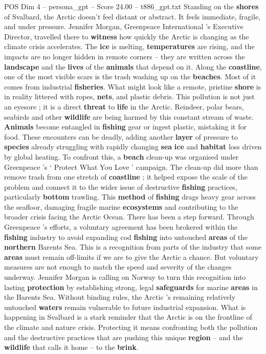 \begin{textsample}{POS Dim 4 – persona\_gpt – Score 24.00 – t886\_gpt.txt}  \label{ex:f4_pos_030}
Standing on the \textbf{shores} of Svalbard, the Arctic doesn't feel distant or abstract.
It feels immediate, fragile, and under pressure.
Jennifer Morgan, Greenpeace International ’s Executive Director, travelled there to \textbf{witness} how quickly the Arctic is changing as the climate crisis accelerates.
The \textbf{ice} is melting, \textbf{temperatures} are rising, and the impacts are no longer hidden in remote corners – they are written across the \textbf{landscape} and the \textbf{lives} of the \textbf{animals} that depend on it.
Along the \textbf{coastline}, one of the most visible scars is the trash washing up on the \textbf{beaches}.
Most of it comes from industrial \textbf{fisheries}.
What might look like a remote, pristine \textbf{shore} is in reality littered with ropes, \textbf{nets}, and plastic debris.
This pollution is not just an eyesore ; it is a direct \textbf{threat} to \textbf{life} in the Arctic.
Reindeer, polar bears, seabirds and other \textbf{wildlife} are being harmed by this constant stream of waste. \textbf{Animals} become entangled in \textbf{fishing} gear or ingest plastic, mistaking it for food.
These encounters can be deadly, adding another \textbf{layer} of pressure to \textbf{species} already struggling with rapidly changing \textbf{sea} \textbf{ice} and \textbf{habitat} loss driven by global heating.
To confront this, a \textbf{beach} clean-up was organised under Greenpeace ’s ‘ Protect What You Love ’ campaign.
The clean-up did more than remove trash from one stretch of \textbf{coastline} ; it helped expose the scale of the problem and connect it to the wider issue of destructive \textbf{fishing} practices, particularly \textbf{bottom} trawling.
This \textbf{method} of \textbf{fishing} drags heavy gear across the seafloor, damaging fragile marine \textbf{ecosystems} and contributing to the broader crisis facing the Arctic Ocean.
There has been a step forward.
Through Greenpeace ’s efforts, a voluntary agreement has been brokered within the \textbf{fishing} industry to avoid expanding cod \textbf{fishing} into untouched \textbf{areas} of the \textbf{northern} Barents Sea.
This is a recognition from parts of the industry that some \textbf{areas} must remain off-limits if we are to give the Arctic a chance.
But voluntary measures are not enough to match the speed and severity of the changes underway.
Jennifer Morgan is calling on Norway to turn this recognition into lasting \textbf{protection} by establishing strong, legal \textbf{safeguards} for marine \textbf{areas} in the Barents Sea.
Without binding rules, the Arctic ’s remaining relatively untouched \textbf{waters} remain vulnerable to future industrial expansion.
What is happening in Svalbard is a stark reminder that the Arctic is on the frontline of the climate and nature crisis.
Protecting it means confronting both the pollution and the destructive practices that are pushing this unique \textbf{region} – and the \textbf{wildlife} that calls it home – to the \textbf{brink}.

\end{textsample}
